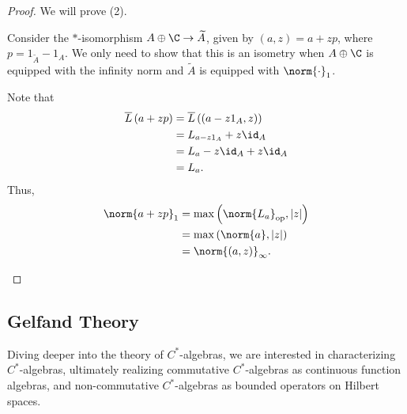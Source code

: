 \documentclass[10pt]{mypackage}
\DeclareMathOperator{\op}{op}
\begin{document}
\begin{proof}
  We will prove (2).
  \begin{description}[font=\normalfont]
    \item[(2)] Consider the $\ast$-isomorphism $A\oplus \C \rightarrow \widetilde{A}$, given by $\left(a,z\right) = a + zp$, where $p = 1_{\widetilde{A}} - 1_{A}$. We only need to show that this is an isometry when $A\oplus \C$ is equipped with the infinity norm and $\widetilde{A}$ is equipped with $\norm{\cdot}_1$.\newline

      Note that
      \begin{align*}
        \overline{L}\left(a + zp\right) &= \overline{L}\left(\left(a-z1_{A},z\right)\right)\\
                                        &= L_{a-z1_A} + z\id_A\\
                                        &= L_a - z\id_A + z\id_A\\
                                        &= L_a.
      \end{align*}
      Thus,
      \begin{align*}
        \norm{a+zp}_1 &= \max\left(\norm{L_a}_{\op},\left\vert z \right\vert\right)\\
                      &= \max\left(\norm{a},\left\vert z \right\vert\right)\\
                      &= \norm{\left(a,z\right)}_{\infty}.
      \end{align*}
  \end{description}
\end{proof}
\subsection{Gelfand Theory}%
Diving deeper into the theory of $C^{\ast}$-algebras, we are interested in characterizing $C^{\ast}$-algebras, ultimately realizing commutative $C^{\ast}$-algebras as continuous function algebras, and non-commutative $C^{\ast}$-algebras as bounded operators on Hilbert spaces.
\end{document}
